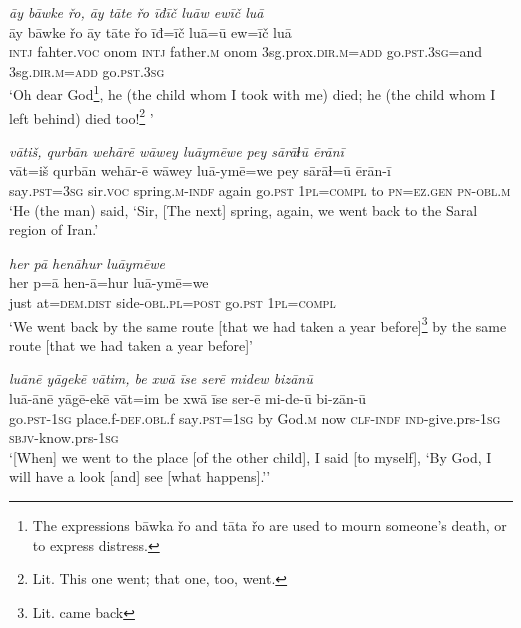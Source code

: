 \ea \label{ZQ.32}
\textit{āy bāwke řo, āy tāte řo īđīč luāw ewīč luā} \\ 
\gll āy bāwke řo āy tāte řo īđ=īč luā=ū ew=īč luā \\ 
 \textsc{intj} fahter.\textsc{voc} onom \textsc{intj} father\textsc{.m} onom 3sg.prox\textsc{.dir}\textsc{.m}\textsc{=add} go\textsc{.pst}\textsc{.3sg}=and 3sg\textsc{.dir}\textsc{.m}\textsc{=add} go\textsc{.pst}\textsc{.3sg} \\ 
\glt `Oh dear God\footnote{The expressions bāwka řo and tāta řo are used to mourn someone’s death, or to express distress.}, he (the child whom I took with me) died; he (the child whom I left behind) died too!\footnote{Lit. This one went; that one, too, went.} '
\z 
 
\ea \label{ZQ.33}
\textit{vātiš, qurbān wehārē wāwey luāymēwe pey sārāɫū ērānī} \\ 
\gll vāt=iš qurbān wehār-ē wāwey luā-ymē=we pey sārāɫ=ū ērān-ī \\ 
 say\textsc{.pst}\textsc{=3sg} sir.\textsc{voc} spring\textsc{.m}\textsc{-indf} again go\textsc{.pst} \textsc{1pl}\textsc{=compl} to \textsc{pn}\textsc{=ez.gen} \textsc{pn}\textsc{-obl}\textsc{.m} \\ 
\glt `He (the man) said, ‘Sir, [The next] spring, again, we went back to the Saral region of Iran.'
\z 
 
\ea \label{ZQ.34}
\textit{her pā henāhur luāymēwe} \\ 
\gll her p=ā hen-ā=hur luā-ymē=we \\ 
 just at=\textsc{dem.dist} side\textsc{-obl}\textsc{.pl}\textsc{=\textsc{post}} go\textsc{.pst} \textsc{1pl}\textsc{=compl} \\ 
\glt `We went back by the same route [that we had taken a year before]\footnote{Lit. came back} by the same route [that we had taken a year before]'
\z 
 
\ea \label{ZQ.35}
\textit{luānē yāgekē vātim, be xwā īse serē midew bizānū} \\ 
\gll luā-ānē yāgē-ekē vāt=im be xwā īse ser-ē mi-de-ū bi-zān-ū \\ 
 go\textsc{.pst}\textsc{-\textsc{1sg}} place.f\textsc{-def}\textsc{.obl}.f say\textsc{.pst}\textsc{=\textsc{1sg}} by God\textsc{.m} now \textsc{clf}\textsc{-indf} \textsc{ind-}give.prs\textsc{-\textsc{1sg}} \textsc{sbjv-}know.prs\textsc{-\textsc{1sg}} \\ 
\glt `[When] we went to the place [of the other child], I said [to myself], ‘By God, I will have a look [and] see [what happens].’'
\z 
 
